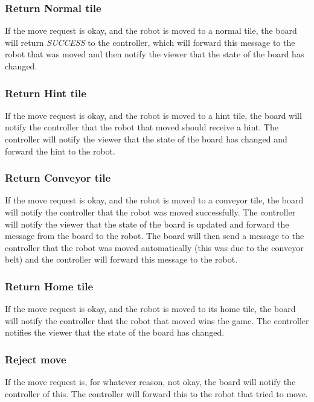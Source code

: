 	\subsubsection{Return Normal tile}
	If the move request is okay, and the robot is moved to a normal tile, the board will return \emph{SUCCESS} to the controller, which will forward this message to the robot that was moved and then notify the viewer that the state of the board has changed.

	

	\subsubsection{Return Hint tile}
	If the move request is okay, and the robot is moved to a hint tile, the board will notify the controller that the robot that moved should receive a hint. The controller will notify the viewer that the state of the board has changed and forward the hint to the robot.

	

	\subsubsection{Return Conveyor tile}
	If the move request is okay, and the robot is moved to a conveyor tile, the board will notify the controller that the robot was moved successfully. The controller will notify the viewer that the state of the board is updated and forward the message from the board to the robot. The board will then send a message to the controller that the robot was moved automatically (this was due to the conveyor belt) and the controller will forward this message to the robot.

	

	\subsubsection{Return Home tile}
	If the move request is okay, and the robot is moved to its home tile, the board will notify the controller that the robot that moved wins the game. The controller notifies the viewer that the state of the board has changed.

	


	\subsubsection{Reject move}
	If the move request is, for whatever reason, not okay, the board will notify the controller of this. The controller will forward this to the robot that tried to move.

